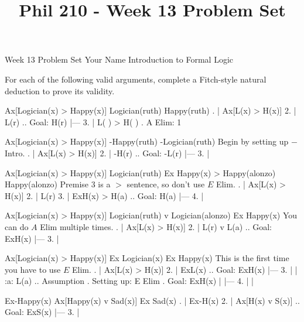
\title{Phil 210 - Week 13 Problem Set}

\heading
Week 13 Problem Set
Your Name
Introduction to Formal Logic
\endheading

For each of the following valid arguments, complete a Fitch-style natural deduction to prove its validity.

\quantifiers
\problems
{}
\argument
 Ax[Logician(x) > Happy(x)]
 Logician(ruth) 
\argumentline
 Happy(ruth) 
\endargument
	\answer
	. | Ax[L(x) > H(x)]
	 2. | L(r)             ..  Goal: H(r)
	    |---
	 3. | L( ) > H( )      .  A Elim: 1
	\endfitchproof
	\endanswer

\argument
 Ax[Logician(x) > Happy(x)]
 -Happy(ruth) 
\argumentline
 -Logician(ruth) 
\endargument
\Hint Begin by setting up $-$ Intro.
	\answer
	. | Ax[L(x) > H(x)]
	 2. | -H(r)             ..  Goal: -L(r)
	    |---
	 3. | 
	\endfitchproof
	\endanswer

\argument
 Ax[Logician(x) > Happy(x)]
 Logician(ruth)
 Ex Happy(x) > Happy(alonzo)
\argumentline
 Happy(alonzo) 
\endargument
\Hint Premise 3 is a $>$ sentence, so don't use $E$ Elim.
	\answer
	. | Ax[L(x) > H(x)]
	 2. | L(r)
	 3. | ExH(x) > H(a)    ..  Goal: H(a)
	    |---
	 4. |
	\endfitchproof
	\endanswer

\argument
 Ax[Logician(x) > Happy(x)]
 Logician(ruth) v Logician(alonzo)
\argumentline
 Ex Happy(x)
\endargument
\Hint You can do $A$ Elim multiple times.
	\answer
	. | Ax[L(x) > H(x)]
	 2. | L(r) v L(a)      ..  Goal: ExH(x)
	    |---
	 3. | 
	\endfitchproof
	\endanswer

\argument
 Ax[Logician(x) > Happy(x)]
 Ex Logician(x)
\argumentline
 Ex Happy(x)
\endargument
\Hint This is the first time you have to use $E$ Elim.
	\answer
	. | Ax[L(x) > H(x)]
	 2. | ExL(x)           ..  Goal: ExH(x)
	    |---
	 3. |   | :a: L(a)     ..  Assumption  .  Setting up: E Elim  .  Goal: ExH(x)
	    |   |---
	 4. |   |
	\endfitchproof
	\endanswer

\argument
 Ex-Happy(x)
 Ax[Happy(x) v Sad(x)]
\argumentline
 Ex Sad(x)
\endargument
	\answer
	. | Ex-H(x)
	 2. | Ax[H(x) v S(x)]  ..  Goal: ExS(x)
	    |---
	 3. | 
	\endfitchproof
	\endanswer

\endproblems
\bye
